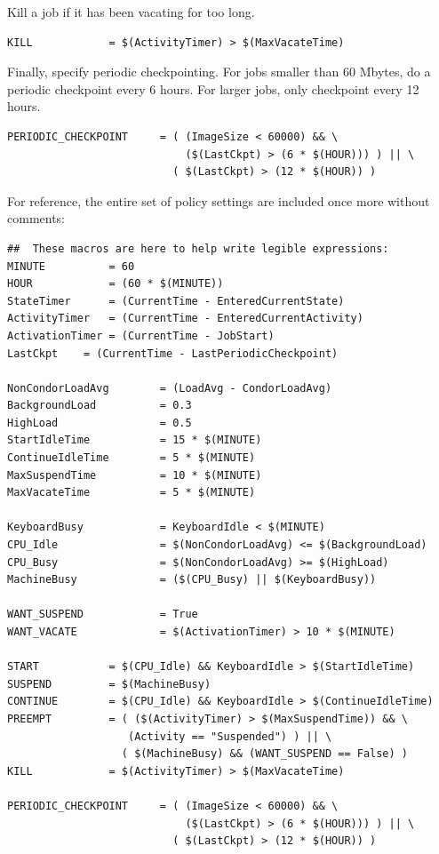 Kill a job if it has been vacating for too long.
\begin{verbatim}
KILL            = $(ActivityTimer) > $(MaxVacateTime)
\end{verbatim}

Finally, specify periodic checkpointing.  
For jobs smaller than 60 Mbytes, do a periodic checkpoint every 6 hours.  
For larger jobs, only checkpoint every 12 hours.
\begin{verbatim}
PERIODIC_CHECKPOINT     = ( (ImageSize < 60000) && \
                            ($(LastCkpt) > (6 * $(HOUR))) ) || \ 
                          ( $(LastCkpt) > (12 * $(HOUR)) )
\end{verbatim}

For reference, the entire set of policy settings are included
once more without comments:

\begin{verbatim}
##  These macros are here to help write legible expressions:
MINUTE          = 60
HOUR            = (60 * $(MINUTE))
StateTimer      = (CurrentTime - EnteredCurrentState)
ActivityTimer   = (CurrentTime - EnteredCurrentActivity)
ActivationTimer = (CurrentTime - JobStart)
LastCkpt	= (CurrentTime - LastPeriodicCheckpoint)

NonCondorLoadAvg        = (LoadAvg - CondorLoadAvg)
BackgroundLoad          = 0.3
HighLoad                = 0.5
StartIdleTime           = 15 * $(MINUTE)
ContinueIdleTime        = 5 * $(MINUTE)
MaxSuspendTime          = 10 * $(MINUTE)
MaxVacateTime           = 5 * $(MINUTE)

KeyboardBusy            = KeyboardIdle < $(MINUTE)
CPU_Idle                = $(NonCondorLoadAvg) <= $(BackgroundLoad)
CPU_Busy                = $(NonCondorLoadAvg) >= $(HighLoad)
MachineBusy             = ($(CPU_Busy) || $(KeyboardBusy))

WANT_SUSPEND            = True
WANT_VACATE             = $(ActivationTimer) > 10 * $(MINUTE)

START           = $(CPU_Idle) && KeyboardIdle > $(StartIdleTime)
SUSPEND         = $(MachineBusy)
CONTINUE        = $(CPU_Idle) && KeyboardIdle > $(ContinueIdleTime)
PREEMPT	        = ( ($(ActivityTimer) > $(MaxSuspendTime)) && \
                   (Activity == "Suspended") ) || \
                  ( $(MachineBusy) && (WANT_SUSPEND == False) )
KILL            = $(ActivityTimer) > $(MaxVacateTime)

PERIODIC_CHECKPOINT     = ( (ImageSize < 60000) && \
                            ($(LastCkpt) > (6 * $(HOUR))) ) || \ 
                          ( $(LastCkpt) > (12 * $(HOUR)) )
\end{verbatim}

